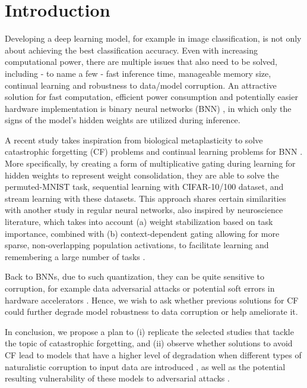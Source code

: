 \documentclass[manuscript,screen,review]{acmart}
\begin{document}
\maketitle

\section{Introduction}
Developing a deep learning model, for example in image classification, is not only about achieving the best classification accuracy. Even with increasing computational power, there are multiple issues that also need to be solved, including - to name a few - fast inference time, manageable memory size, continual learning and robustness to data/model corruption. An attractive solution for fast computation, efficient power consumption and potentially easier hardware implementation is binary neural networks (BNN) \cite{DBLP:journals/corr/CourbariauxB16}, in which only the signs of the model’s hidden weights are utilized during inference. 

A recent study takes inspiration from biological metaplasticity to solve catastrophic forgetting (CF) problems and continual learning problems for BNN \cite{Laborieux_Ernoult_Hirtzlin_Querlioz_2021}. More specifically, by creating a form of multiplicative gating during learning for hidden weights to represent weight consolidation, they are able to solve the permuted-MNIST task, sequential learning with CIFAR-10/100 dataset, and stream learning with these datasets. This approach shares certain similarities with another study in regular neural networks, also inspired by neuroscience literature, which takes into account (a) weight stabilization based on task importance, combined with (b) context-dependent gating allowing for more sparse, non-overlapping population activations, to facilitate learning and remembering a large number of tasks \cite{Masse_2018}. 

Back to BNNs, due to such quantization, they can be quite sensitive to corruption, for example data adversarial attacks \cite{Lin_2019} or potential soft errors in hardware accelerators \cite{Khoshavi2020}. Hence, we wish to ask whether previous solutions for CF \cite{Laborieux_Ernoult_Hirtzlin_Querlioz_2021} could further degrade model robustness to data corruption or help ameliorate it.

In conclusion, we propose a plan to (i) replicate the selected studies that tackle the topic of catastrophic forgetting, and (ii) observe whether solutions to avoid CF lead to models that have a higher level of degradation when different types of naturalistic corruption to input data are introduced \cite{Hendrycks_2018}, as well as the potential resulting vulnerability of these models to adversarial attacks \cite{Lin_2019}.
\end{document}
